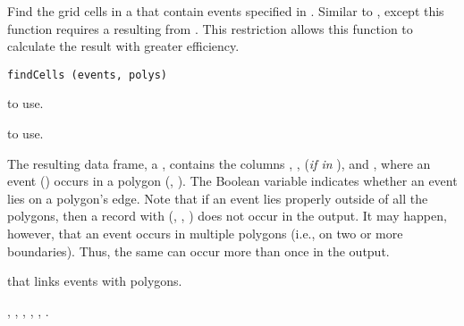 \documentclass[letterpaper]{book}
\begin{document}
%
\begin{Description}\relax
Find the grid cells in a  that contain events specified in
.  Similar to , except this
function requires a  resulting from
.  This restriction allows this function to
calculate the result with greater efficiency.
\end{Description}
%
\begin{Usage}
\begin{verbatim}
findCells (events, polys)
\end{verbatim}
\end{Usage}
%
\begin{Arguments}
\begin{ldescription}
\item[\code{events}]  to use.
\item[\code{polys}]  to use.
\end{ldescription}
\end{Arguments}
%
\begin{Details}\relax
The resulting data frame, a , contains the columns
, ,  (\emph{if in} ), and
, where an event () occurs in a polygon
(, ). The Boolean variable  indicates
whether an event lies on a polygon's edge.  Note that if an event lies
properly outside of all the polygons, then a record with (,
, ) does not occur in the output.  It may happen,
however, that an event occurs in multiple polygons (i.e., on two or
more boundaries).  Thus, the same  can occur more than once
in the output.
\end{Details}
%
\begin{Value}
 that links events with polygons.
\end{Value}
%
\begin{SeeAlso}\relax
{},
,
,
,
,
.
\end{SeeAlso}
%
\end{document}
